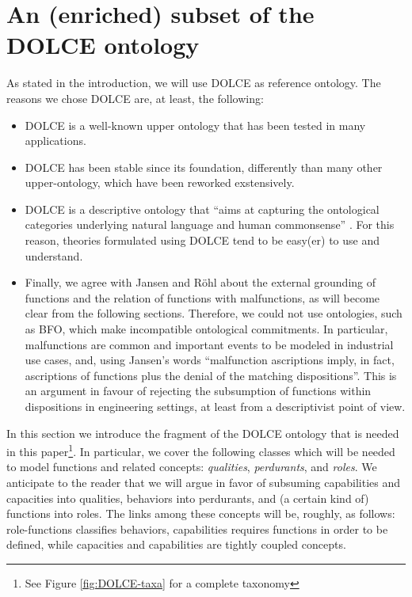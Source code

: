 \documentclass[sw]{iosart2x}
\newcommand{\DOLCE}{\textsc{DOLCE}\xspace} %
\newcommand{\BFO}{\textsc{BFO}\xspace}
\newcommand{\firstTimeKeyWord}[1]{\textit{#1}}
\newcommand{\qquotes}[1]{``#1''}
\begin{document}
\section{An (enriched) subset of the \DOLCE ontology\label{sec:DOLCE}} 
As stated in the introduction, we will use \DOLCE as reference ontology. 
The reasons we chose \DOLCE are, at least, the following:
\begin{itemize}
  \item \DOLCE is a well-known upper ontology that has been tested in many applications.
  \item \DOLCE has been stable since its foundation, differently than many other upper-ontology, which have been reworked exstensively.
  \item \DOLCE is a descriptive ontology that \qquotes{aims at capturing the ontological categories underlying natural language and human commonsense} \cite{masoloWonderWebDeliverableD182003}. 
  For this reason, theories formulated using \DOLCE tend to be easy(er) to use and understand.
  \item Finally, we agree with Jansen and Röhl \cite{rohlWhyFunctionsAre2014,jansenFunctionsMalfunctioningNegative2018} about the external grounding of functions and the relation of functions with malfunctions, as will become clear from the following sections. 
  Therefore, we could not use ontologies, such as \BFO, which make incompatible ontological commitments. 
  In particular, malfunctions are common and important events to be modeled in industrial use cases, and, using Jansen's words \cite{jansenFunctionsMalfunctioningNegative2018} \qquotes{malfunction ascriptions imply, in fact, ascriptions of functions plus the denial of the matching dispositions}. This is an argument in favour of rejecting the subsumption of functions within dispositions in engineering settings, at least from a descriptivist point of view.  
\end{itemize}

In this section we introduce the fragment of the \DOLCE ontology \cite{masoloWonderWebDeliverableD182003,borgoDOLCEDescriptiveOntology2022} that is needed in this paper\footnote{See Figure \ref{fig:DOLCE-taxa} for a complete taxonomy}. In particular, we cover the following classes which will be needed to model functions and related concepts: \firstTimeKeyWord{qualities}, \firstTimeKeyWord{perdurants}, and \firstTimeKeyWord{roles}. 
We anticipate to the reader that we will argue in favor of subsuming capabilities and capacities into qualities, behaviors into perdurants, and (a certain kind of) functions into roles. The links among these concepts will be, roughly, as follows: role-functions classifies behaviors, capabilities requires functions in order to be defined, while capacities and capabilities are tightly coupled concepts.  
\end{document}
